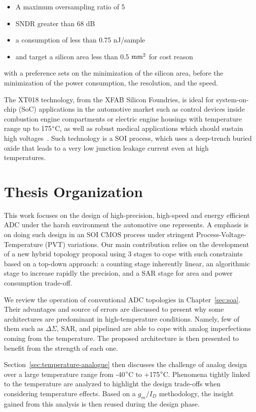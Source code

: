 \begin{itemize}
	\item A maximum oversampling ratio of 5
	\item SNDR greater than 68 dB
	\item a consumption of less than 0.75 nJ/sample
	\item and target a silicon area less than 0.5 \(\rm mm^2 \) for cost reason
\end{itemize}
 
with a preference sets on the minimization of the silicon area, before the minimization of the power consumption, the resolution, and the speed.

The XT018 technology, from the XFAB Silicon Foundries, is ideal for system-on-chip (SoC) applications in the automotive market such as control devices inside combustion engine compartments or electric engine housings with temperature range up to 175$\degree$C, as well as robust medical applications which should sustain high voltages~\cite{XT018XFab}. Such technology is a SOI process, which uses a deep-trench buried oxide that leads to a very low junction leakage current even at high temperatures.

\section{Thesis Organization}

This work focuses on the design of high-precision, high-speed and energy efficient ADC under the harsh environment the automotive one represents. A emphasis is on doing such design in an SOI CMOS process under stringent Process-Voltage-Temperature (PVT) variations. Our main contribution relies on the development of a new hybrid topology proposal using 3 stages to cope with such constraints based on a top-down approach: a counting stage inherently linear, an algorithmic stage to increase rapidly the precision, and a SAR stage for area and power consumption trade-off.

We review the operation of conventional ADC topologies in Chapter~\ref{sec:soa}. Their advantages and source of errors are discussed to present why some architectures are predominant in high-temperature conditions. Namely, few of them such as \(\Delta \Sigma\), SAR, and pipelined are able to cope with analog imperfections coming from the temperature. The proposed architecture is then presented to benefit from the strength of each one.

Section~\ref{sec:temperature-analogue} then discusses the challenge of analog design over a large temperature range from -40\(\degree\)C to +175\(\degree\)C. Phenomena tightly linked to the temperature are analyzed to highlight the design trade-offs when considering temperature effects. Based on a \(g_m/I_D\) methodology, the insight gained from this analysis is then reused during the design phase.


